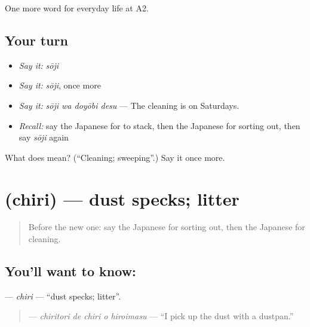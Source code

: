 \begin{grammarlens}[title={What you've built}]
One more word for everyday life at A2.
\end{grammarlens}

\subsection*{Your turn}
\begin{itemize}
\raggedright
  \item \emph{Say it:} \emph{sōji}
  \item \emph{Say it:} \emph{sōji}, once more
  \item \emph{Say it:} \emph{sōji wa doyōbi desu} — The cleaning is on Saturdays.
  \item \emph{Recall:} say the Japanese for to stack, then the Japanese for sorting out, then say \emph{sōji} again
\end{itemize}

\begin{tcolorbox}[breakable,colback=teal!4,colframe=teal!35!black,title={Before you move on}]
What does  mean? (\textquotedblleft{}Cleaning; sweeping\textquotedblright{}.) Say it once more.
\end{tcolorbox}
\section[\texorpdfstring{\ja{ちり} (chiri)}{ちり (chiri)}]{ (chiri) — dust specks; litter}

\label{lesson:JA-C160-chiri}



\begin{quote}
Before the new one: say the Japanese for sorting out, then the Japanese for cleaning.
\end{quote}

\subsection*{You'll want to know: }
\textbf{} — \emph{chiri} — \textquotedblleft{}dust specks; litter\textquotedblright{}.

\begin{quote}
\textbf{  } — \emph{chiritori de chiri o hiroimasu} — \textquotedblleft{}I pick up the dust with a dustpan.\textquotedblright{}
\end{quote}

